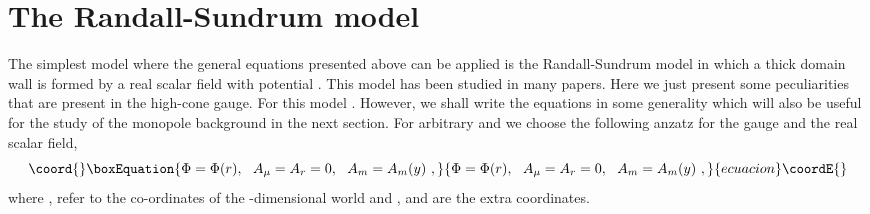 \documentclass[a4paper,12pt]{article}
\begin{document}
\section{The  Randall-Sundrum model}

The simplest model where the general equations presented above can be
applied is the Randall-Sundrum model in which a thick domain  wall is
formed by a real scalar field \myHighlight{$\Phi$}\coordHE{} with potential \coordHE{}. This
model has been studied in many papers. Here  we just present some
peculiarities that are present in the high-cone gauge. For this model
\coordHE{}. However, we shall write the equations in some
generality which will also be useful for the study of the monopole
background in the next section. For arbitrary \coordHE{} and \coordHE{} we choose
the following anzatz for the gauge and the real scalar field,
\begin{equation}\coord{}\boxEquation{
 \Phi = \Phi(r),~~A_\mu= A_r=0,~~A_m=A_m(y)~,
\label{fields}
}{
 \Phi = \Phi(r),~~A_\mu= A_r=0,~~A_m=A_m(y)~,
}{ecuacion}\coordE{}\end{equation}
where \coordHE{}, \coordHE{} refer to the co-ordinates of
the \coordHE{}-dimensional world and \coordHE{}, \coordHE{} and \coordHE{} are
the extra coordinates.
\end{document}
